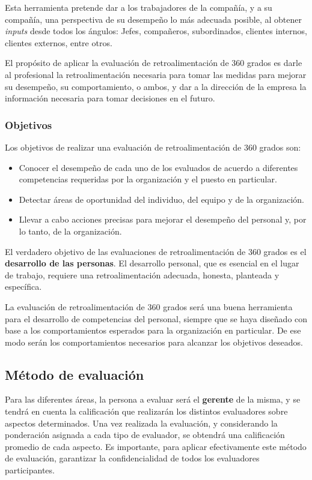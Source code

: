 Esta herramienta pretende dar a los trabajadores de la compañía, y a su compañía, una perspectiva de su desempeño lo más adecuada posible, al obtener \textit{inputs} desde todos los ángulos: Jefes, compañeros, subordinados, clientes internos, clientes externos, entre otros.

El propósito de aplicar la evaluación de retroalimentación de 360 grados es darle al profesional la retroalimentación necesaria para tomar las medidas para mejorar su desempeño, su comportamiento, o ambos, y dar a la dirección de la empresa la información necesaria para tomar decisiones en el futuro.


\subsubsection{Objetivos}

Los objetivos de realizar una evaluación de retroalimentación de 360 grados son:

\begin{itemize}
    \item Conocer el desempeño de cada uno de los evaluados de acuerdo a diferentes competencias requeridas por la organización y el puesto en particular.
    \item Detectar áreas de oportunidad del individuo, del equipo y de la organización.
    \item Llevar a cabo acciones precisas para mejorar el desempeño del personal y, por lo  tanto, de la organización.
\end{itemize}

El verdadero objetivo de las evaluaciones de retroalimentación de 360 grados es el \textbf{desarrollo de las personas}.
El desarrollo personal, que es esencial en el lugar de trabajo, requiere una retroalimentación adecuada, honesta, planteada y específica.

La evaluación de retroalimentación de 360 grados será una buena herramienta para el desarrollo de competencias del personal, siempre que se haya diseñado con base a los comportamientos esperados para la organización en particular.
De ese modo serán los comportamientos necesarios para alcanzar los objetivos deseados.


\subsection{Método de evaluación}

Para las diferentes áreas, la persona a evaluar será el \textbf{gerente} de la misma, y se tendrá en cuenta la calificación que realizarán los distintos evaluadores sobre aspectos determinados.
Una vez realizada la evaluación, y considerando la ponderación asignada a cada tipo de evaluador, se obtendrá una calificación promedio de cada aspecto.
Es importante, para aplicar efectivamente este método de evaluación, garantizar la confidencialidad de todos los evaluadores participantes.

